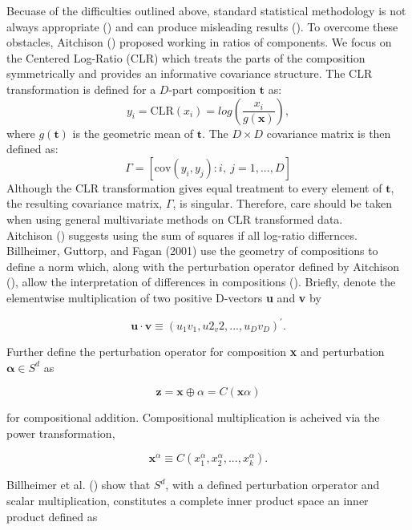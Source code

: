\documentclass{article}\usepackage[]{graphicx}\usepackage[]{color}
\begin{document}
Becuase of the difficulties outlined above, standard statistical methodology is not always appropriate (\cite{Aitchison1986}) and can produce misleading results (\cite{Lovell2015}).  To overcome these obstacles, Aitchison (\cite{Aitchison1980}) proposed working in ratios of components. We focus on the Centered Log-Ratio (CLR) which treats the parts of the composition symmetrically and provides an informative covariance structure.  The CLR transformation is defined for a $D$-part composition $\mathbf{t}$ as:
\begin{equation}
y_i  = \text{CLR}(x_i) = log \left(\frac{x_i}{g(\mathbf{x})} \right),
\label{clr}
\end{equation}
where $g(\mathbf{t})$ is the geometric mean of $\mathbf{t}$.  The $D \times D$ covariance matrix is then defined as:
\begin{equation}
\Gamma = \left[\text{cov}\left(y_i, y_j \right): i,\ j = 1, ..., D \right]
\label{gamma}
\end{equation}
Although the CLR transformation gives equal treatment to every element of $\mathbf{t}$, the resulting covariance matrix, $\Gamma$, is singular.  Therefore, care should be taken when using general multivariate methods on CLR transformed data.\\



Aitchison (\cite{Aitchison1986, Aitchison1992}) suggests using the sum of squares if all log-ratio differnces.  Billheimer, Guttorp, and Fagan (2001) use the geometry of compositions to define a norm which, along with the perturbation operator defined by Aitchison (\cite{Aitchison1986}), allow the interpretation of differences in compositions (\cite{Billheimer2001}). Briefly, denote the elementwise multiplication of two positive D-vectors \textbf{u} and \textbf{v} by  

$$\mathbf{u}\cdot \mathbf{v} \equiv \left( u_1v_1, u2_v2, ..., u_Dv_D\right)^\prime.$$

Further define the perturbation operator for composition \textbf{x} and perturbation $\mathbf{\alpha} \in S^{d}$ as

$$\mathbf{z} = \mathbf{x}\oplus \alpha = C\left(\mathbf{x}\alpha \right)$$

for compositional addition.  Compositional multiplication is acheived via the power transformation, 

$$\mathbf{x}^\alpha \equiv C\left(x_1^\alpha, x_2^\alpha, ..., x_k^\alpha \right).$$

Billheimer et al. (\cite{Billheimer2001}) show that $S^d$, with a defined perturbation orperator and scalar multiplication, constitutes a complete inner product space an inner product defined as
\end{document}
